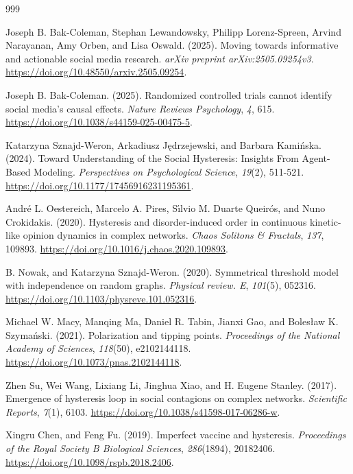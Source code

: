 \begin{thebibliography}{999}

Joseph B. Bak-Coleman, Stephan Lewandowsky, Philipp Lorenz-Spreen, Arvind Narayanan, Amy Orben, and Lisa Oswald. (2025). Moving towards informative and actionable social media research. \textit{arXiv preprint arXiv:2505.09254v3}. \url{https://doi.org/10.48550/arxiv.2505.09254}.

Joseph B. Bak-Coleman. (2025). Randomized controlled trials cannot identify social media's causal effects. \textit{Nature Reviews Psychology}, \textit{4}, 615. \url{https://doi.org/10.1038/s44159-025-00475-5}.

Katarzyna Sznajd-Weron, Arkadiusz J\k{e}drzejewski, and Barbara Kami\'{n}ska. (2024). Toward Understanding of the Social Hysteresis: Insights From Agent-Based Modeling. \textit{Perspectives on Psychological Science}, \textit{19}(2), 511-521. \url{https://doi.org/10.1177/17456916231195361}.

Andr\'{e} L. Oestereich, Marcelo A. Pires, S\'{\i}lvio M. Duarte Queir\'{o}s, and Nuno Crokidakis. (2020). Hysteresis and disorder-induced order in continuous kinetic-like opinion dynamics in complex networks. \textit{Chaos Solitons \& Fractals}, \textit{137}, 109893. \url{https://doi.org/10.1016/j.chaos.2020.109893}.

B. Nowak, and Katarzyna Sznajd-Weron. (2020). Symmetrical threshold model with independence on random graphs. \textit{Physical review. E}, \textit{101}(5), 052316. \url{https://doi.org/10.1103/physreve.101.052316}.

Michael W. Macy, Manqing Ma, Daniel R. Tabin, Jianxi Gao, and Boles\l{}aw K. Szyma\'{n}ski. (2021). Polarization and tipping points. \textit{Proceedings of the National Academy of Sciences}, \textit{118}(50), e2102144118. \url{https://doi.org/10.1073/pnas.2102144118}.

Zhen Su, Wei Wang, Lixiang Li, Jinghua Xiao, and H. Eugene Stanley. (2017). Emergence of hysteresis loop in social contagions on complex networks. \textit{Scientific Reports}, \textit{7}(1), 6103. \url{https://doi.org/10.1038/s41598-017-06286-w}.

Xingru Chen, and Feng Fu. (2019). Imperfect vaccine and hysteresis. \textit{Proceedings of the Royal Society B Biological Sciences}, \textit{286}(1894), 20182406. \url{https://doi.org/10.1098/rspb.2018.2406}.


\end{thebibliography}
